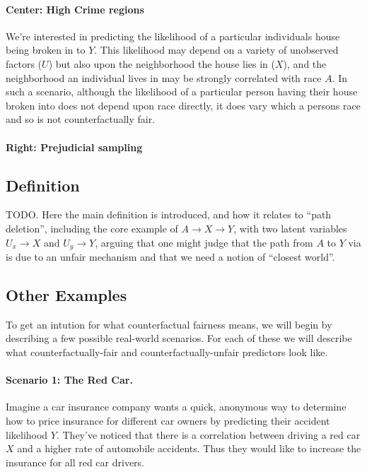 \paragraph{Center: High Crime regions} We're interested in predicting
the likelihood of a particular individuals house being broken in to
$Y$. This likelihood may depend on a variety of unobserved factors
($U$) but also upon the neighborhood the house lies in ($X$), and the
neighborhood an individual lives in may be strongly correlated with
race $A$. In such a scenario, although the likelihood of a particular
person having their house broken into does not depend upon race
directly, it does vary which a persons race and so is not
counterfactually fair.

\paragraph{Right: Prejudicial sampling}
\subsection{Definition}

TODO. Here the main definition is introduced, and how it relates to ``path deletion'',
including the core example of $A \rightarrow X \rightarrow Y$, with two latent
variables $U_x \rightarrow X$ and $U_y \rightarrow Y$, arguing that one might judge
that the path from $A$ to $Y$ via is due to an unfair mechanism and that we need a
notion of ``closest world''.

\subsection{Other Examples}
To get an intution for what counterfactual fairness means, we will begin by describing a few possible real-world scenarios. For each of these we will describe what counterfactually-fair and counterfactually-unfair predictors look like.

\paragraph{Scenario 1: The Red Car.}
Imagine a car insurance company wants a quick, anonymous way to determine how to price insurance for different car owners by predicting their accident likelihood $Y$. They've noticed that there is a correlation between driving a red car $X$ and a higher rate of automobile accidents. Thus they would like to increase the insurance for all red car drivers. 

